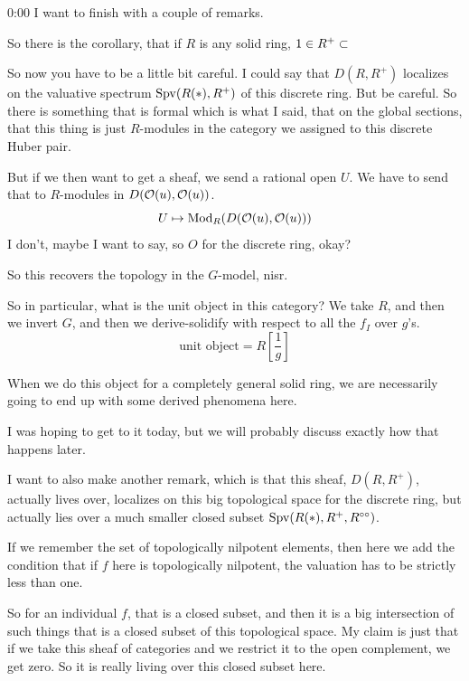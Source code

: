 \begin{unfinished}{0:00}
I want to finish with a couple of remarks.

\begin{remark}
So there is the corollary, that if $R$ is any solid ring, $1 \in R^+ \subset $ 

So now you have to be a little bit careful. I could say that $D(R, R^+)$ localizes on the valuative spectrum $\operatorname{Spv}(R(\ast), R^+)$ of this discrete ring. But be careful. So there is something that is formal which is what I said, that on the global sections, that this thing is just $R$-modules in the category we assigned to this  discrete Huber pair.

But if we then want to get a sheaf, we send a rational open $U$. We have to send that to $R$-modules in $D(\mathcal O(u), \mathcal O(u))$.
\[
U \mapsto \operatorname{Mod}_R ( D(\mathcal O(u), \mathcal O(u)) )
\]
I don't, maybe I want to say, so $O$ for the discrete ring, okay?

So this recovers the topology in the $G$-model, nisr. 

So in particular, what is the unit object in this category? We take $R$, and then we invert $G$, and then we derive-solidify with respect to all the $f_I$ over $g$'s.
\[
\text{unit object} = R[\frac{1}{g}]
\]

When we do this object for a completely general solid ring, we are necessarily going to end up with some derived phenomena here.

I was hoping to get to it today, but we will probably discuss exactly how that happens later. 

\end{remark}

\begin{remark}

I want to also make another remark, which is that this sheaf, $D(R, R^+)$, actually lives over, localizes on this big topological space for the discrete ring, but actually lies over a much smaller closed subset $\operatorname{Spv}(R(\ast), R^+, R^{\circ\circ})$.

If we remember the set of topologically nilpotent elements, then here  we add the condition that if $f$ here is topologically nilpotent, the valuation has to be strictly less than one. 

So for an individual $f$, that is a closed subset, and then it is a big intersection of such things that is a closed subset of this topological space. My claim is just that if we take this sheaf of categories and we restrict it to the open complement, we get zero. So it is really living over this closed subset here.


\end{remark}
\end{unfinished}
